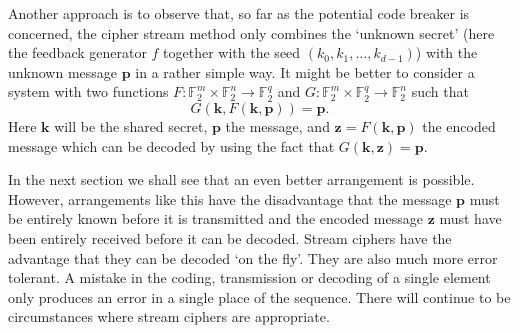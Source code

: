 \documentclass[12pt,a4paper]{article}
\theoremstyle{plain}
\theoremstyle{definition}
\begin{document}
    Another approach is to observe that,
    so far as the potential code breaker is
    concerned, the
    cipher stream method only combines the
    `unknown secret' (here the feedback generator
    $f$ together with the seed $(k_{0},k_{1},\dots,k_{d-1})$)
    with the unknown message ${\mathbf p}$ in a rather
    simple way. It might be better to consider a system
    with two functions
    $F:{\mathbb F}_{2}^{m}\times{\mathbb F}_{2}^{n}
    \rightarrow{\mathbb F}_{2}^{q}$ and
    $G:{\mathbb F}_{2}^{m}\times{\mathbb F}_{2}^{q}
    \rightarrow{\mathbb F}_{2}^{n}$
    such that
    \[G({\mathbf k},F({\mathbf k},{\mathbf p}))={\mathbf p}.\]
    Here ${\mathbf k}$ will be
    the shared secret, ${\mathbf p}$ the message, and
    ${\mathbf z}=F({\mathbf k},{\mathbf p})$ the
    encoded message which can be decoded by
    using the fact that $G({\mathbf k},{\mathbf z})
    ={\mathbf p}$.

    In the next section we shall see that an even
    better arrangement is possible. However, arrangements
    like this have the disadvantage that
    the message ${\mathbf p}$ must be entirely known
    before it is transmitted and the encoded
    message ${\mathbf z}$ must have been entirely
    received before it can be decoded. Stream ciphers
    have the advantage that they can be decoded
    `on the fly'. They are also much more error
    tolerant. A mistake in the coding, transmission
    or decoding of a single element only produces
    an error in a single place of the sequence.
    There will continue to be circumstances
    where stream ciphers are appropriate.
\end{document}
